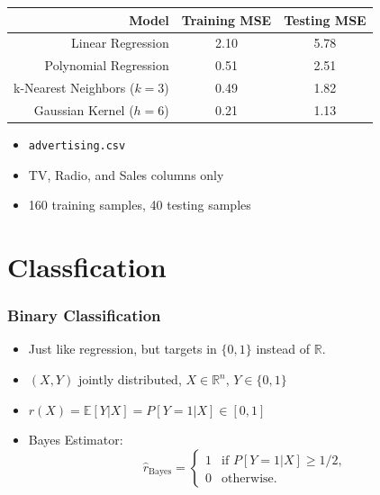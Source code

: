\documentclass[xcolor={dvipsnames}]{beamer}
\renewcommand{\hat}{\widehat}
\newcommand{\EE}{\mathbb{E}}
\newcommand{\RR}{\mathbb{R}}
\begin{document}
\begin{frame}
    \setlength\parskip{0.75em}

    \begin{center}
    \begin{tabular}{rcc}
        \textbf{Model} & \textbf{Training MSE} & \textbf{Testing MSE}\\[1ex]\hline
        Linear Regression & 2.10 & 5.78\\[1ex]
        Polynomial Regression & 0.51 & 2.51\\[1ex]
        k-Nearest Neighbors ($k=3$) & 0.49 & 1.82\\[1ex]
        Gaussian Kernel ($h=6$) & 0.21 & 1.13\\\hline
    \end{tabular}
\end{center}

\begin{itemize}
    \setlength\parskip{0.75em}

    \item \texttt{advertising.csv}
    \item TV, Radio, and Sales columns only
    \item 160 training samples, 40 testing samples
\end{itemize}
\end{frame}

\section{Classfication}
\begin{frame}
    \frametitle{Binary Classification}
    \begin{itemize}
        \setlength\itemsep{1em}
        \item Just like regression, but targets in $\{0,1\}$ instead of $\RR$.
        \item $(X,Y)$ jointly distributed, $X\in\RR^n$, $Y\in\{0,1\}$
        \item $r(X) = \EE[Y|X] = P[Y=1|X] \in [0,1]$
        \item Bayes Estimator: $$\hat r_{\text{Bayes}} = \begin{cases}
        1&\text{if $P[Y=1|X]\geq 1/2$,}\\0&\text{otherwise.}
        \end{cases}$$
    \end{itemize}
\end{frame}
\end{document}
